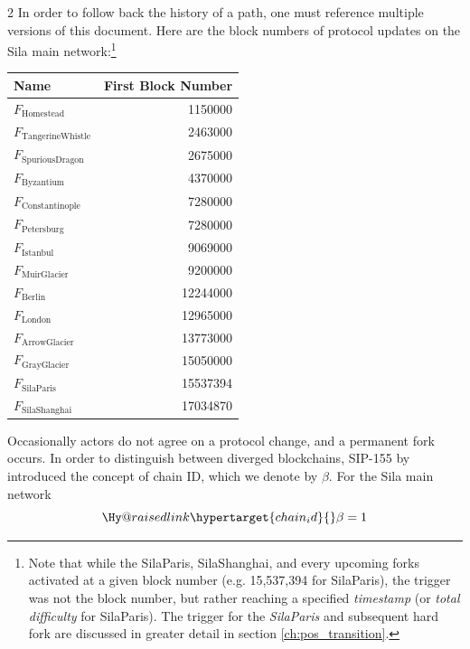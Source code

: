 \documentclass[9pt,oneside]{amsart}
\makeatletter
\newcommand{\linkdest}[1]{\Hy@raisedlink{\hypertarget{#1}{}}}
\makeatother
\begin{document}
\begin{multicols}{2}
In order to follow back the history of a path, one must reference multiple versions of this document.
Here are the block numbers of protocol updates on the Sila main network:\footnote{Note that while the SilaParis, SilaShanghai, and every upcoming forks activated at a given block number (e.g. 15,537,394 for SilaParis), the trigger was not the block number, but rather reaching a specified \textit{timestamp} (or \textit{total difficulty} for SilaParis). The trigger for the \textit{SilaParis} and subsequent hard fork are discussed in greater detail in section \ref{ch:pos_transition}.}
\par
\begin{center}
\begin{tabular}{lr}
\toprule
Name & First Block Number \\
\midrule
$F_{\mathrm{Homestead}}$         &  1150000 \\
$F_{\mathrm{Tangerine Whistle}}$ &  2463000 \\
$F_{\mathrm{Spurious Dragon}}$   &  2675000 \\
$F_{\mathrm{Byzantium}}$         &  4370000 \\
$F_{\mathrm{Constantinople}}$    &  7280000 \\
$F_{\mathrm{Petersburg}}$        &  7280000 \\
$F_{\mathrm{Istanbul}}$          &  9069000 \\
$F_{\mathrm{Muir Glacier}}$      &  9200000 \\
$F_{\mathrm{Berlin}}$            & 12244000 \\
$F_{\mathrm{London}}$            & 12965000 \\
$F_{\mathrm{Arrow Glacier}}$     & 13773000 \\
$F_{\mathrm{Gray Glacier}}$      & 15050000 \\
$F_{\mathrm{SilaParis}}$             & 15537394 \\
$F_{\mathrm{SilaShanghai}}$          & 17034870 \\
\bottomrule
\end{tabular}
\end{center}
\par

Occasionally actors do not agree on a protocol change, and a permanent fork occurs.
In order to distinguish between diverged blockchains, SIP-155 by \cite{SIP-155} introduced the concept of chain ID, which we denote by $\beta$.
For the Sila main network
\begin{equation}
  \linkdest{chain_id}
  \beta = 1
\end{equation}


\end{multicols}
\end{document}
